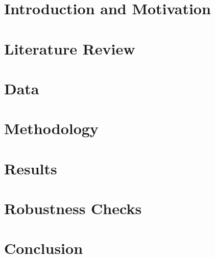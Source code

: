 \documentclass[12pt,oneside,reqno]{amsart}
\begin{document}


\section{Introduction and Motivation}



\section{Literature Review}
\label{Literature}



\section{Data}
\label{Data}


 
\section{Methodology}
\label{Methodology}


\section{Results}
\label{Results}


\section{Robustness Checks}

\label{Robustness}

\section{Conclusion}
\label{Conclusion}



\newpage
{}



%
\end{document}
